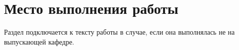 \chapter{Место выполнения работы}

Раздел подключается к тексту работы в случае, если она выполнялась не на выпускающей кафедре.
